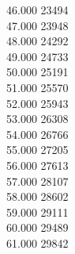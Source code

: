 { 46.000	23494 \\
 47.000	23948 \\
 48.000	24292 \\
 49.000	24733 \\
 50.000	25191 \\
 51.000	25570 \\
 52.000	25943 \\
 53.000	26308 \\
 54.000	26766 \\
 55.000	27205 \\
 56.000	27613 \\
 57.000	28107 \\
 58.000	28602 \\
 59.000	29111 \\
 60.000	29489 \\
 61.000	29842 \\
}
